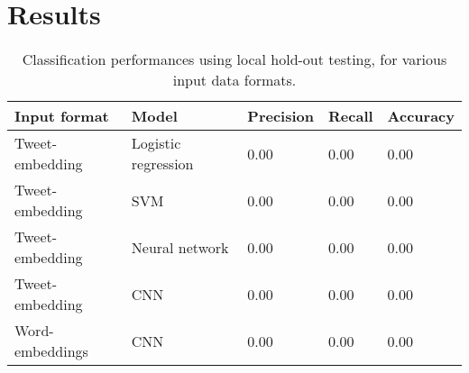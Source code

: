 \section{Results}
\label{sec:results}

\begin{table}[h]
  \centering
  \begin{tabular}[c]{lllll}
    Input format&Model&Precision&Recall&Accuracy\\
    \hline
    Tweet-embedding&Logistic regression & 0.00       & 0.00  & 0.00 \\
    Tweet-embedding&SVM                 & 0.00       & 0.00  & 0.00 \\
    Tweet-embedding&Neural network	& 0.00	& 0.00	&	0.00 \\
    Tweet-embedding&CNN                 & 0.00	& 0.00	&	0.00 \\
    Word-embeddings&CNN                 & 0.00	& 0.00	&	0.00 \\
  \end{tabular}
  \caption{Classification performances using local hold-out testing, for various input data formats.}
  \label{tab:results}
\end{table}
